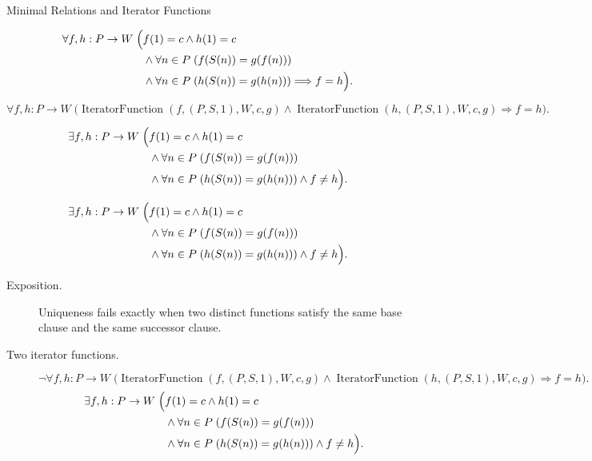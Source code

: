 \begin{topicbox}{Minimal Relations and Iterator Functions}
\begin{remark*}
\[
\begin{aligned}
\forall f,h:P\to W\;\Bigl(&
f(1)=c\land h(1)=c\\
&\land \forall n\in P\;(f(S(n))=g(f(n)))\\
&\land \forall n\in P\;(h(S(n))=g(h(n)))
\Longrightarrow f=h\Bigr).
\end{aligned}
\]
\end{remark*}

\begin{remark*}
\[
\forall f,h:P\to W\;
\bigl(\operatorname{IteratorFunction}(f,(P,S,1),W,c,g)
\land \operatorname{IteratorFunction}(h,(P,S,1),W,c,g)
\Longrightarrow f=h\bigr).
\]
\end{remark*}

\begin{remark*}
\[
\begin{aligned}
\exists f,h:P\to W\;\Bigl(&
f(1)=c\land h(1)=c\\
&\land \forall n\in P\;(f(S(n))=g(f(n)))\\
&\land \forall n\in P\;(h(S(n))=g(h(n)))
\land f\neq h\Bigr).
\end{aligned}
\]
\end{remark*}

\begin{remark*}
\[
\begin{aligned}
\exists f,h:P\to W\;\Bigl(&
f(1)=c\land h(1)=c\\
&\land \forall n\in P\;(f(S(n))=g(f(n)))\\
&\land \forall n\in P\;(h(S(n))=g(h(n)))
\land f\neq h\Bigr).
\end{aligned}
\]
\end{remark*}

\begin{remark*}
\begin{description}
  \item[Exposition.]
  Uniqueness fails exactly when two distinct functions satisfy the same base
  clause and the same successor clause.
  \item[Two iterator functions.]
  \[
  \neg\forall f,h:P\to W\;
  \bigl(\operatorname{IteratorFunction}(f,(P,S,1),W,c,g)
  \land \operatorname{IteratorFunction}(h,(P,S,1),W,c,g)
  \Longrightarrow f=h\bigr).
  \]
  \[
  \begin{aligned}
  \exists f,h:P\to W\;\Bigl(&
  f(1)=c\land h(1)=c\\
  &\land \forall n\in P\;(f(S(n))=g(f(n)))\\
  &\land \forall n\in P\;(h(S(n))=g(h(n)))
  \land f\neq h\Bigr).
  \end{aligned}
  \]
\end{description}
\end{remark*}


\end{topicbox}
